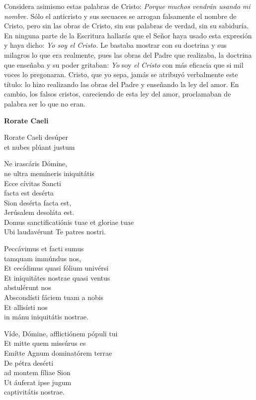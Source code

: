 Considera asimismo estas palabras de Cristo: \emph{Porque muchos vendrán 	usando mi nombre.} Sólo el anticristo y sus secuaces se arrogan falsamente el nombre de Cristo, pero sin las obras de Cristo, sin sus palabras de verdad, sin su sabiduría. En ninguna parte de la Escritura hallarás que el Señor haya usado esta expresión y haya dicho: \emph{Yo 	soy el Cristo.} Le bastaba mostrar con su doctrina y sus milagros lo que era realmente, pues las obras del Padre que realizaba, la doctrina que enseñaba y su poder gritaban: \emph{Yo} soy \emph{el Cristo} con más eficacia que si mil voces lo pregonaran. Cristo, que yo sepa, jamás se atribuyó verbalmente este título: lo hizo realizando las obras del Padre y enseñando la ley del amor. En cambio, los falsos cristos, careciendo de esta ley del amor, proclamaban de palabra ser lo que no eran.

\textbf{Rorate Caeli}



Rorate Caeli desúper\\ et nubes plúant justum

Ne irascáris Dómine,\\ ne ultra memíneris iniquitátis\\ Ecce cívitas Sancti\\ facta est desérta\\ Sion desérta facta est,\\ Jerúsalem desoláta est.\\ Domus sanctificatiónis tuae et gloriae tuae\\ Ubi laudavérunt Te patres nostri.

Peccávimus et facti sumus\\ tamquam immúndus nos,\\ Et cecídimus quasi fólium univérsi\\ Et iniquitátes nostrae quasi ventus\\ abstulérunt nos\\ Abscondísti fáciem tuam a nobis\\ Et allisísti nos\\ in mánu iniquitátis nostrae.

Víde, Dómine, afflictiónem pópuli tui\\ Et mitte quem missúrus es\\ Emítte Agnum dominatórem terrae\\ De pétra desérti\\ ad montem fíliae Sion\\ Ut áuferat ipse jugum\\ captivitátis nostrae.

